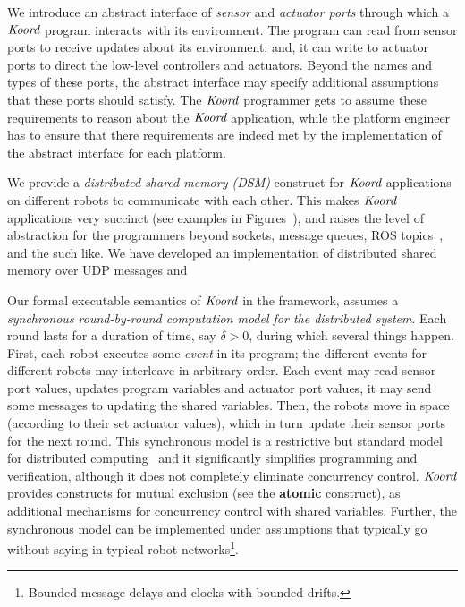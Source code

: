 \begin{inparaenum}[(i)]
\item We introduce an abstract interface of \emph{sensor} and \emph{actuator ports} through which a $\emph{Koord}$ program interacts with its environment. The program can read from sensor ports to receive updates about its environment;  and, it can write to actuator ports to direct the low-level controllers and actuators. Beyond the names and types of these ports, the abstract interface may specify additional assumptions  that these ports should satisfy. The $\emph{Koord}$ programmer gets to assume these requirements to reason about the $\emph{Koord}$ application, while the platform engineer has to ensure that there requirements are indeed met by the implementation of the abstract interface for each platform.
\item We provide a {\em distributed shared memory (DSM)\/} construct for $\emph{Koord}$ applications  on different robots to communicate with each other. This makes  $\emph{Koord}$ applications very succinct (see examples in Figures~{}), and raises the level of abstraction for the programmers beyond sockets, message queues, ROS topics~\cite{}, and the such like. We have developed an implementation of distributed shared memory over UDP messages and 
\item Our formal executable semantics of $\emph{Koord}$ in the \K framework, assumes a {\em synchronous round-by-round computation model for the distributed system\/}. Each round lasts for a duration of time, say $\delta >0$, during which several things happen. First, each robot  executes some {\em event\/} in its program; the different events for different robots may interleave in arbitrary order. Each event may read sensor port values, updates program variables and actuator port values, it may send  some messages to updating the shared variables. Then, the  robots move in space (according to their set actuator values), which in turn update their sensor ports for the next round. This synchronous  model is a restrictive but standard model for distributed computing~\cite{lynch1996a,attiyawelch} and it significantly simplifies programming and verification, although it does not completely eliminate concurrency control. $\emph{Koord}$ provides constructs for mutual exclusion (see the \textbf{atomic} construct), as additional mechanisms for concurrency control with shared variables. Further, the synchronous model can be implemented under  assumptions that typically go without saying in typical robot networks\footnote{Bounded message delays and clocks with bounded drifts.}.  

\end{inparaenum}
